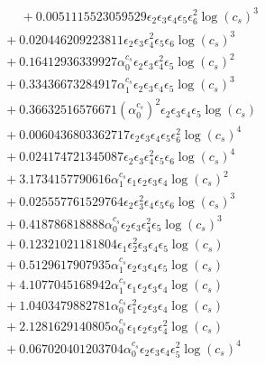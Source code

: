 \documentclass[10pt]{article}
\begin{document}
\begin{align*}
\phantom{F_{s,6}} &\phantom{={}}{}  + 0.0051115523059529 \epsilon_{2} \epsilon_{3} \epsilon_{4} \epsilon_{5} \epsilon_{6}^{2} \log{\left(c_{s} \right)}^{3} \\
&{}  + 0.020446209223811 \epsilon_{2} \epsilon_{3} \epsilon_{4}^{2} \epsilon_{5} \epsilon_{6} \log{\left(c_{s} \right)}^{3} \\
&{}  + 0.16412936339927 \alpha_{0}^{c_s} \epsilon_{2} \epsilon_{3} \epsilon_{4}^{2} \epsilon_{5} \log{\left(c_{s} \right)}^{2} \\
&{}  + 0.33436673284917 \alpha_{1}^{c_s} \epsilon_{2} \epsilon_{3} \epsilon_{4} \epsilon_{5} \log{\left(c_{s} \right)}^{3} \\
&{}  + 0.36632516576671 \left(\alpha_{0}^{c_s}\right)^{2} \epsilon_{2} \epsilon_{3} \epsilon_{4} \epsilon_{5} \log{\left(c_{s} \right)} \\
&{}  + 0.0060436803362717 \epsilon_{2} \epsilon_{3} \epsilon_{4} \epsilon_{5} \epsilon_{6}^{2} \log{\left(c_{s} \right)}^{4} \\
&{}  + 0.024174721345087 \epsilon_{2} \epsilon_{3} \epsilon_{4}^{2} \epsilon_{5} \epsilon_{6} \log{\left(c_{s} \right)}^{4} \\
&{}  + 3.1734157790616 \alpha_{1}^{c_s} \epsilon_{1} \epsilon_{2} \epsilon_{3} \epsilon_{4} \log{\left(c_{s} \right)}^{2} \\
&{}  + 0.025557761529764 \epsilon_{2} \epsilon_{3}^{2} \epsilon_{4} \epsilon_{5} \epsilon_{6} \log{\left(c_{s} \right)}^{3} \\
&{}  + 0.418786818888 \alpha_{0}^{c_s} \epsilon_{2} \epsilon_{3} \epsilon_{4}^{2} \epsilon_{5} \log{\left(c_{s} \right)}^{3} \\
&{}  + 0.12321021181804 \epsilon_{1} \epsilon_{2}^{2} \epsilon_{3} \epsilon_{4} \epsilon_{5} \log{\left(c_{s} \right)} \\
&{}  + 0.5129617907935 \alpha_{1}^{c_s} \epsilon_{2} \epsilon_{3} \epsilon_{4} \epsilon_{5} \log{\left(c_{s} \right)} \\
&{}  + 4.1077045168942 \alpha_{1}^{c_s} \epsilon_{1} \epsilon_{2} \epsilon_{3} \epsilon_{4} \log{\left(c_{s} \right)} \\
&{}  + 1.0403479882781 \alpha_{0}^{c_s} \epsilon_{1}^{2} \epsilon_{2} \epsilon_{3} \epsilon_{4} \log{\left(c_{s} \right)} \\
&{}  + 2.1281629140805 \alpha_{0}^{c_s} \epsilon_{1} \epsilon_{2} \epsilon_{3} \epsilon_{4}^{2} \log{\left(c_{s} \right)} \\
&{}  + 0.067020401203704 \alpha_{0}^{c_s} \epsilon_{2} \epsilon_{3} \epsilon_{4} \epsilon_{5}^{2} \log{\left(c_{s} \right)}^{4} \\

\end{align*}
\end{document}
